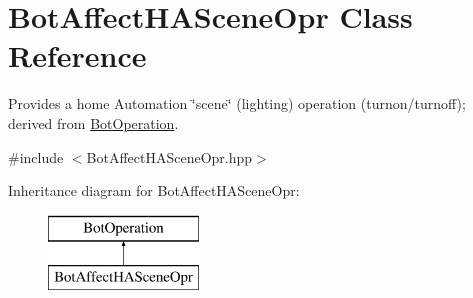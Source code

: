 \hypertarget{classBotAffectHASceneOpr}{\section{Bot\-Affect\-H\-A\-Scene\-Opr Class Reference}
\label{classBotAffectHASceneOpr}
}


Provides a home Automation \char`\"{}scene\char`\"{} (lighting) operation (turnon/turnoff); derived from \hyperlink{classBotOperation}{Bot\-Operation}.  




{\ttfamily \#include $<$Bot\-Affect\-H\-A\-Scene\-Opr.\-hpp$>$}

Inheritance diagram for Bot\-Affect\-H\-A\-Scene\-Opr\-:\begin{figure}[H]
\begin{center}
\leavevmode
\includegraphics[height=2.000000cm]{classBotAffectHASceneOpr}
\end{center}
\end{figure}
